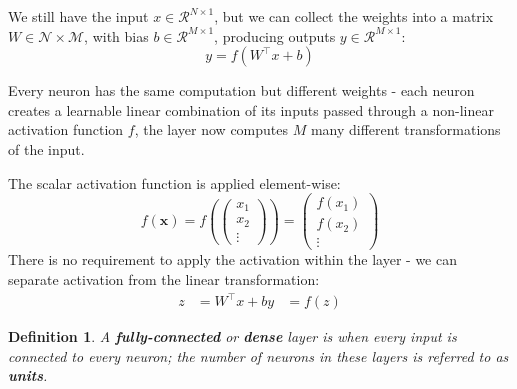 \documentclass[11pt]{article}
\newtheorem{defn}{Definition}
\begin{document}
We still have the input $x \in \mathcal{R}^{N \times 1}$, but we can collect the weights into a matrix $W \in \mathcal{N \times M}$, with bias $b \in \mathcal{R}^{M \times 1}$, producing outputs $y \in \mathcal{R}^{M \times 1}$:
\[
  y = f(W^\intercal x + b) 
\]

Every neuron has the same computation but different weights - each neuron creates a learnable linear combination of its inputs passed through a non-linear activation function $f$, the layer now computes $M$ many different transformations of the input.

The scalar activation function is applied element-wise:
\[
  f(\textbf{x}) = 
  f 
  \left( 
    \begin{pmatrix}
      x_1 \\ x_2 \\ \vdots
    \end{pmatrix}
  \right) 
  =
  \begin{pmatrix}
    f(x_1) \\ f(x_2) \\ \vdots
  \end{pmatrix}
\]
There is no requirement to apply the activation within the layer - we can separate activation from the linear transformation:
\begin{align*}
  z &= W^\intercal x + b 
  y &= f(z)
\end{align*}

\begin{defn}
  A \textbf{fully-connected} or \textbf{dense} layer is when every input is connected to every neuron; the number of neurons in these layers is referred to as \textbf{units}.
\end{defn}
\end{document}
